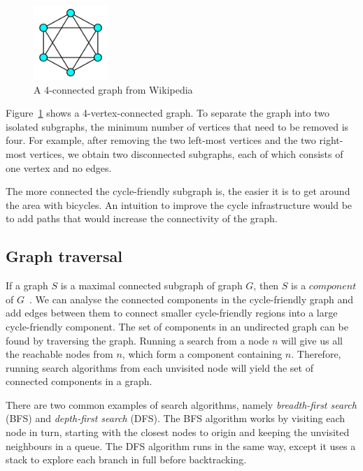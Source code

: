 \documentclass[12pt,a4paper]{report}
\begin{document}
\begin{figure}[ht]
    \centering
    \includegraphics[width=0.25\textwidth]{plan_images/connectivity.png}
    \caption{A 4-connected graph from Wikipedia~\cite{WikipediaEN:Connectivity}}
    \label{fig:connectivity4}
\end{figure}

Figure~\ref{fig:connectivity4} shows a 4-vertex-connected graph. To separate the graph into two isolated subgraphs, the minimum number of vertices that need to be removed is four. For example, after removing the two left-most vertices and the two right-most vertices, we obtain two disconnected subgraphs, each of which consists of one vertex and no edges. 

The more connected the cycle-friendly subgraph is, the easier it is to get around the area with bicycles. An intuition to improve the cycle infrastructure would be to add paths that would increase the connectivity of the graph.

\subsection{Graph traversal}
If a graph $S$ is a maximal connected subgraph of graph $G$, then $S$ is a $component$ of $G$~\cite{citeulike:395714}. We can analyse the connected components in the cycle-friendly graph and add edges between them to connect smaller cycle-friendly regions into a large cycle-friendly component. The set of components in an undirected graph can be found by traversing the graph. Running a search from a node $n$ will give us all the reachable nodes from $n$, which form a component containing $n$. Therefore, running search algorithms from each unvisited node will yield the set of connected components in a graph.

There are two common examples of search algorithms, namely \textit{breadth-first search} (BFS) and \textit{depth-first search} (DFS). The BFS algorithm works by visiting each node in turn, starting with the closest nodes to origin and keeping the unvisited neighbours in a queue. The DFS algorithm runs in the same way, except it uses a stack to explore each branch in full before backtracking.
\end{document}
